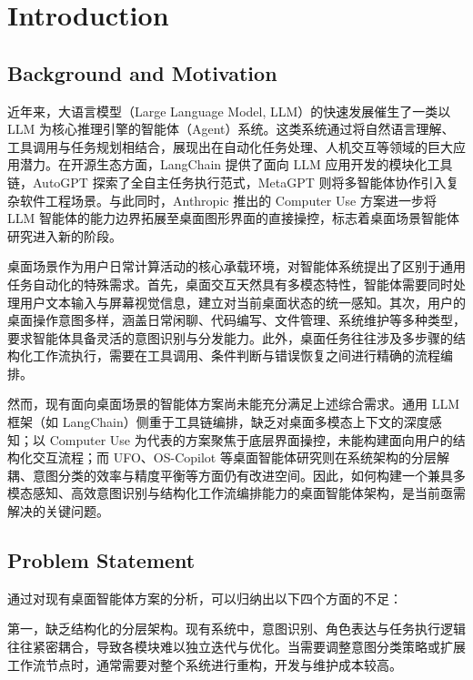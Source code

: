 \section{Introduction}

\subsection{Background and Motivation}

近年来，大语言模型（Large Language Model, LLM）的快速发展催生了一类以 LLM 为核心推理引擎的智能体（Agent）系统。这类系统通过将自然语言理解、工具调用与任务规划相结合，展现出在自动化任务处理、人机交互等领域的巨大应用潜力。在开源生态方面，LangChain\cite{chase2022langchain} 提供了面向 LLM 应用开发的模块化工具链，AutoGPT\cite{richards2023autogpt} 探索了全自主任务执行范式，MetaGPT\cite{hong2023metagpt} 则将多智能体协作引入复杂软件工程场景。与此同时，Anthropic 推出的 Computer Use\cite{anthropic2024computeruse} 方案进一步将 LLM 智能体的能力边界拓展至桌面图形界面的直接操控，标志着桌面场景智能体研究进入新的阶段。

桌面场景作为用户日常计算活动的核心承载环境，对智能体系统提出了区别于通用任务自动化的特殊需求。首先，桌面交互天然具有多模态特性，智能体需要同时处理用户文本输入与屏幕视觉信息，建立对当前桌面状态的统一感知。其次，用户的桌面操作意图多样，涵盖日常闲聊、代码编写、文件管理、系统维护等多种类型，要求智能体具备灵活的意图识别与分发能力。此外，桌面任务往往涉及多步骤的结构化工作流执行，需要在工具调用、条件判断与错误恢复之间进行精确的流程编排。

然而，现有面向桌面场景的智能体方案尚未能充分满足上述综合需求。通用 LLM 框架（如 LangChain\cite{chase2022langchain}）侧重于工具链编排，缺乏对桌面多模态上下文的深度感知；以 Computer Use\cite{anthropic2024computeruse} 为代表的方案聚焦于底层界面操控，未能构建面向用户的结构化交互流程；而 UFO\cite{zhang2025ufo}、OS-Copilot\cite{wu2024oscopilot} 等桌面智能体研究则在系统架构的分层解耦、意图分类的效率与精度平衡等方面仍有改进空间。因此，如何构建一个兼具多模态感知、高效意图识别与结构化工作流编排能力的桌面智能体架构，是当前亟需解决的关键问题。

\subsection{Problem Statement}

通过对现有桌面智能体方案的分析，可以归纳出以下四个方面的不足：

第一，缺乏结构化的分层架构。现有系统中，意图识别、角色表达与任务执行逻辑往往紧密耦合，导致各模块难以独立迭代与优化。当需要调整意图分类策略或扩展工作流节点时，通常需要对整个系统进行重构，开发与维护成本较高。

